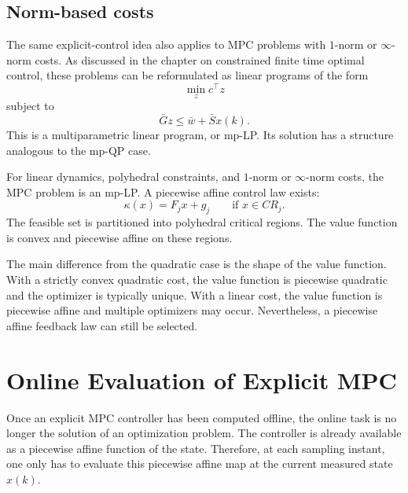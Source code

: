 \subsection{Norm-based costs}

The same explicit-control idea also applies to MPC problems with \(1\)-norm or \(\infty\)-norm
costs. As discussed in the chapter on constrained finite time optimal control, these problems can
be reformulated as linear programs of the form
\[
    \min_z c^\top z
\]
subject to
\[
    \bar{G}z\leq \bar{w}+\bar{S}x(k).
\]
This is a multiparametric linear program, or mp-LP. Its solution has a structure analogous to
the mp-QP case.

\begin{theorembox}
For linear dynamics, polyhedral constraints, and \(1\)-norm or \(\infty\)-norm costs, the MPC
problem is an mp-LP. A piecewise affine control law exists:
\[
    \kappa(x)=F_jx+g_j
    \qquad \text{if } x\in CR_j.
\]
The feasible set is partitioned into polyhedral critical regions. The value function is convex and
piecewise affine on these regions.
\end{theorembox}

The main difference from the quadratic case is the shape of the value function. With a strictly
convex quadratic cost, the value function is piecewise quadratic and the optimizer is typically
unique. With a linear cost, the value function is piecewise affine and multiple optimizers may
occur. Nevertheless, a piecewise affine feedback law can still be selected.

\section{Online Evaluation of Explicit MPC}

Once an explicit MPC controller has been computed offline, the online task is no longer the
solution of an optimization problem. The controller is already available as a piecewise affine
function of the state. Therefore, at each sampling instant, one only has to evaluate this
piecewise affine map at the current measured state \(x(k)\).\\

